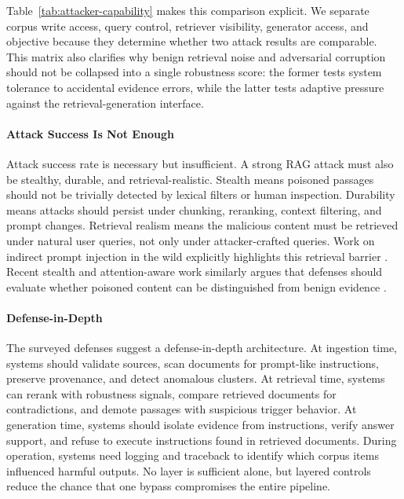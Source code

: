 Table~\ref{tab:attacker-capability} makes this comparison explicit. We separate corpus write access, query control, retriever visibility, generator access, and objective because they determine whether two attack results are comparable. This matrix also clarifies why benign retrieval noise and adversarial corruption should not be collapsed into a single robustness score: the former tests system tolerance to accidental evidence errors, while the latter tests adaptive pressure against the retrieval-generation interface.

\paragraph{Attack Success Is Not Enough}

Attack success rate is necessary but insufficient. A strong RAG attack must also be stealthy, durable, and retrieval-realistic. Stealth means poisoned passages should not be trivially detected by lexical filters or human inspection. Durability means attacks should persist under chunking, reranking, context filtering, and prompt changes. Retrieval realism means the malicious content must be retrieved under natural user queries, not only under attacker-crafted queries. Work on indirect prompt injection in the wild explicitly highlights this retrieval barrier \citep{rrag005}. Recent stealth and attention-aware work similarly argues that defenses should evaluate whether poisoned content can be distinguished from benign evidence \citep{rrag015}.

\paragraph{Defense-in-Depth}

The surveyed defenses suggest a defense-in-depth architecture. At ingestion time, systems should validate sources, scan documents for prompt-like instructions, preserve provenance, and detect anomalous clusters. At retrieval time, systems can rerank with robustness signals, compare retrieved documents for contradictions, and demote passages with suspicious trigger behavior. At generation time, systems should isolate evidence from instructions, verify answer support, and refuse to execute instructions found in retrieved documents. During operation, systems need logging and traceback to identify which corpus items influenced harmful outputs. No layer is sufficient alone, but layered controls reduce the chance that one bypass compromises the entire pipeline.
